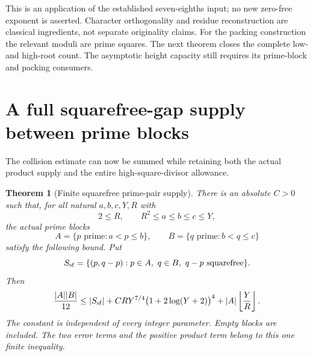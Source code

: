 \documentclass[11pt]{article}
\newtheorem{theorem}{Theorem}[section]
\begin{document}
This is an application of the established seven-eighths input;
no new zero-free exponent is asserted. Character orthogonality
and residue reconstruction are classical ingredients, not
separate originality claims. For the packing construction the
relevant moduli are prime squares. The next theorem closes the
complete low- and high-root count. The asymptotic height capacity
still requires its prime-block and packing consumers.

\section{A full squarefree-gap supply between prime blocks}
\label{sec:squarefree-prime-block-supply}

The collision estimate can now be summed while retaining both the actual
product supply and the entire high-square-divisor allowance.

\begin{theorem}[Finite squarefree prime-pair supply]
\label{thm:squarefree-prime-block-supply}
There is an absolute \(C>0\) such that, for all natural
\(a,b,c,Y,R\) with
\[
 2\le R,\qquad R^2\le a\le b\le c\le Y,
\]
the actual prime blocks
\[
 A=\{p\text{ prime}:a<p\le b\},\qquad
 B=\{q\text{ prime}:b<q\le c\}
\]
satisfy the following bound. Put
\[
 S_{\rm sf}=\{(p,q-p):p\in A,\ q\in B,\ q-p\text{ squarefree}\}.
\]
Then
\begin{equation}
 \frac{|A||B|}{12}
 \le |S_{\rm sf}|
    +CRY^{7/4}\bigl(1+2\log(Y+2)\bigr)^4
    +|A|\left\lfloor\frac YR\right\rfloor .
 \label{eq:squarefree-prime-block-supply}
\end{equation}
The constant is independent of every integer parameter. Empty blocks
are included. The two error terms and the positive product term belong
to this one finite inequality.
\end{theorem}
\end{document}
